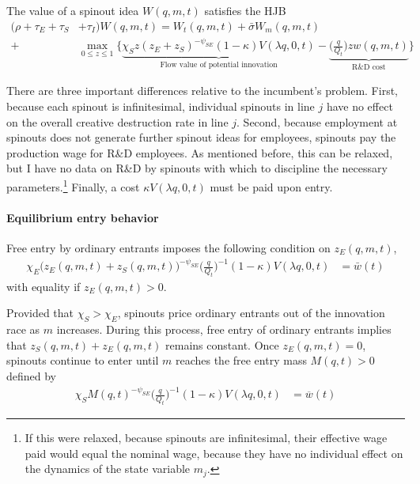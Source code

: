 \documentclass[11pt,english]{article}
\theoremstyle{remark}
\begin{document}
The value of a spinout idea $W(q,m,t)$ satisfies the HJB
\begin{align}
	(\rho  + \tau_E + \tau_S& + \tau_I)W(q,m,t) = W_t(q,m,t) + \bar{\sigma}W_m(q,m,t) \nonumber \\
	+& \max_{0 \le z \le 1} \Big\{ \underbrace{\chi_S z (z_E + z_S)^{-\psi_{SE}} (1-\kappa) V(\lambda q,0,t)}_{\textrm{Flow value of potential innovation}} - \underbrace{\Big(\frac{q}{Q_t}\Big) z w(q,m,t)}_{\textrm{R\&D cost}} \Big\} \label{HJB_S}
\end{align}

There are three important differences relative to the incumbent's problem. First, because each spinout is infinitesimal, individual spinouts in line $j$ have no effect on the overall creative destruction rate in line $j$. Second, because employment at spinouts does not generate further spinout ideas for employees, spinouts pay the production wage for R\&D employees. As mentioned before, this can be relaxed, but I have no data on R\&D by spinouts with which to discipline the necessary parameters.\footnote{If this were relaxed, because spinouts are infinitesimal, their effective wage paid would equal the nominal wage, because they have no individual effect on the dynamics of the state variable $m_j$.} Finally, a cost $\kappa V(\lambda q, 0, t)$ must be paid upon entry. 

\paragraph{Equilibrium entry behavior}

Free entry by ordinary entrants imposes the following condition on $z_E(q,m,t)$, 
\begin{align}
\chi_E \big( z_E(q,m,t) + z_S(q,m,t) \big)^{-\psi_{SE}} \Big(\frac{q}{Q_t}\Big)^{-1}  (1-\kappa) V(\lambda q,0,t)  &= \bar{w}(t)\label{free_entry_entrants}
\end{align}
with equality if $z_E(q,m,t) > 0$. 

Provided that $\chi_S > \chi_E$, spinouts price ordinary entrants out of the innovation race as $m$ increases. During this process, free entry of ordinary entrants implies that $z_S(q,m,t) + z_E(q,m,t)$ remains constant. Once $z_E(q,m,t) = 0$, spinouts continue to enter until $m$ reaches the free entry mass $M(q,t) > 0$ defined by
\begin{align}
	\chi_S  M(q,t)^{-\psi_{SE}}\Big(\frac{q}{Q_t}\Big)^{-1} (1-\kappa) V(\lambda q,0,t)  &= \overline{w}(t) \label{free_entry_spinouts}
\end{align}
\end{document}
